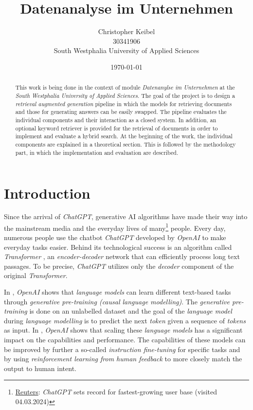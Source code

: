 \documentclass{article}
\title{Datenanalyse im Unternehmen}
\author{Christopher Keibel \\ 30341906 \\South Westphalia University of Applied Sciences }
\date{\today}
\begin{document}
\maketitle

\begin{abstract}
This work is being done in the context of module \textit{Datenanylse im Unternehmen} at the \textit{South Westphalia University of Applied Sciences}. The goal of the project is to design a \textit{retrieval augmented generation} pipeline in which the models for retrieving documents and those for generating answers can be easily swapped. The pipeline evaluates the individual components and their interaction as a closed system. In addition, an optional keyword retriever is provided for the retrieval of documents in order to implement and evaluate a hybrid search. At the beginning of the work, the individual components are explained in a theoretical section. This is followed by the methodology part, in which the implementation and evaluation are described. 
\end{abstract}

\newpage

\tableofcontents
\newpage
{}
\section{Introduction} \label{Introduction}
Since the arrival of \textit{ChatGPT}, generative AI algorithms have made their way into the mainstream media and the everyday lives of many\footnote{\href{https://www.reuters.com/technology/chatgpt-sets-record-fastest-growing-user-base-analyst-note-2023-02-01/}{Reuters}: \textit{ChatGPT} sets record for fastest-growing user base (visited 04.03.2024)} people. Every day, numerous people use the chatbot \textit{ChatGPT} developed by \textit{OpenAI} to make everyday tasks easier. Behind its technological success is an algorithm called \textit{Transformer} \cite{attentionIsAllYouNeed}, an \textit{encoder-decoder} network that can efficiently process long text passages. To be precise, \textit{ChatGPT} utilizes only the \textit{decoder}\cite{GPT1} component of the original \textit{Transformer}.

In \cite{GPT1, GPT2}, \textit{OpenAI} shows that \textit{language models} can learn different text-based tasks through \textit{generative pre-training (causal language modelling)}. The \textit{generative pre-training} is done on an unlabelled dataset and the goal of the \textit{language model} during \textit{language modelling} is to predict the next \textit{token} given a sequence of \textit{tokens} as input. In \cite{GPT3}, \textit{OpenAI} shows that scaling these \textit{language models} has a significant impact on the capabilities and performance. The capabilities of these models can be improved by further a so-called \textit{instruction fine-tuning} \cite{instructionFineTuning} for specific tasks and by using \textit{reinforcement learning from human feedback} \cite{RLHF} to more closely match the output to human intent.
\end{document}
